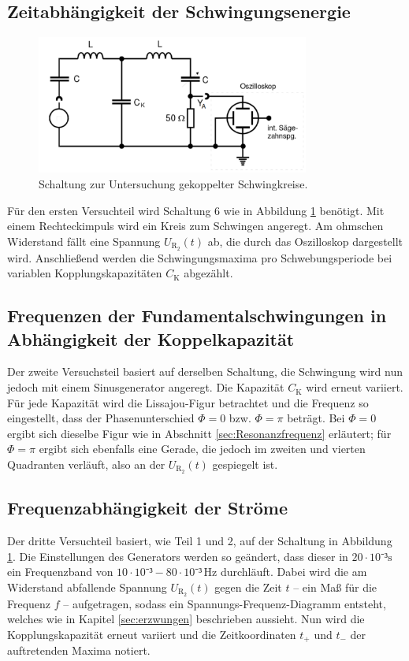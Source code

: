 \subsection{Zeitabhängigkeit der Schwingungsenergie}

\begin{figure}[h]
	\centering
		\includegraphics[width=0.8\textwidth]{Bilder/Versuchsaufbau.pdf}		
\caption{Schaltung zur Untersuchung gekoppelter Schwingkreise.}
	\label{fig:versuchsaufbau}
\end{figure}
Für den ersten Versuchteil wird Schaltung 6 wie in Abbildung \ref{fig:versuchsaufbau} benötigt. Mit einem Rechteckimpuls wird ein Kreis zum Schwingen angeregt. Am ohmschen Widerstand fällt eine Spannung $U_\mathup{R_2}(t)$ ab, die durch das Oszilloskop dargestellt wird. Anschließend werden die Schwingungsmaxima pro Schwebungsperiode bei variablen Kopplungskapazitäten $C_\mathup{K}$ abgezählt.

\subsection{Frequenzen der Fundamentalschwingungen in Abhängigkeit der Koppelkapazität}
Der zweite Versuchsteil basiert auf derselben Schaltung, die Schwingung wird nun jedoch mit einem Sinusgenerator angeregt.
Die Kapazität $C_\mathup{K}$ wird erneut variiert. Für jede Kapazität wird die Lissajou-Figur betrachtet und die Frequenz so eingestellt, dass der Phasenunterschied $\Phi=0$ bzw. $\Phi=\pi$ beträgt. Bei $\Phi=0$ ergibt sich dieselbe Figur wie in Abschnitt \ref{sec:Resonanzfrequenz} erläutert; für $\Phi=\pi$  ergibt sich ebenfalls eine Gerade, die jedoch im zweiten und vierten Quadranten verläuft, also an der $U_\mathup{R_2}(t)$ gespiegelt ist.

\subsection{Frequenzabhängigkeit der Ströme}

Der dritte Versuchteil basiert, wie Teil 1 und 2, auf der Schaltung in Abbildung \ref{fig:versuchsaufbau}. Die Einstellungen des Generators werden so geändert, dass dieser in $20\cdot10⁻³\si\second$ ein Frequenzband von $10\cdot10⁻³-80\cdot10⁻³\,\si{\hertz}$ durchläuft. Dabei wird die am Widerstand abfallende Spannung $U_\mathup{R_2}(t)$ gegen die Zeit $t$ -- ein Maß für die Frequenz $f$ -- aufgetragen, sodass ein Spannungs-Frequenz-Diagramm entsteht, welches wie in Kapitel \ref{sec:erzwungen} beschrieben aussieht. Nun wird die Kopplungskapazität erneut variiert und die Zeitkoordinaten $t_+$ und $t_-$ der auftretenden Maxima notiert.
